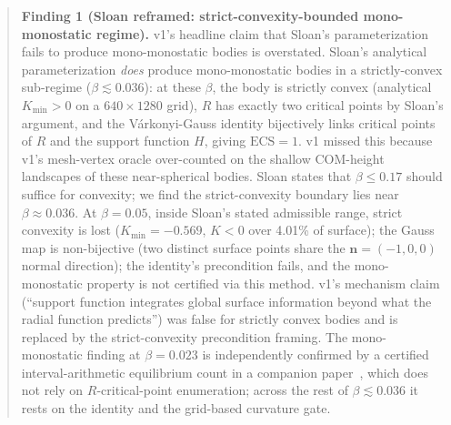 \documentclass[11pt,a4paper]{article}
\begin{document}
\begin{abstract}
\textbf{Finding 1 (Sloan reframed: strict-convexity-bounded
mono-monostatic regime).} v1's headline claim that Sloan's
parameterization fails to produce mono-monostatic bodies is
overstated. Sloan's analytical parameterization \emph{does} produce
mono-monostatic bodies in a strictly-convex sub-regime
($\beta \lesssim 0.036$): at these $\beta$, the body is strictly
convex (analytical $K_{\min} > 0$ on a $640 \times 1280$ grid),
$R$ has exactly two critical points by Sloan's argument, and the
V\'arkonyi-Gauss identity bijectively links critical points of $R$
and the support function $H$, giving $\mathrm{ECS} = 1$. v1 missed
this because v1's mesh-vertex oracle over-counted on the shallow
COM-height landscapes of these near-spherical bodies. Sloan states that $\beta \le 0.17$
should suffice for convexity; we find the strict-convexity boundary
lies near $\beta \approx 0.036$. At $\beta = 0.05$, inside Sloan's
stated admissible range, strict convexity is lost
($K_{\min} = -0.569$, $K<0$ over 4.01\% of surface); the Gauss
map is non-bijective (two distinct surface points share the
$\mathbf{n} = (-1,0,0)$ normal direction); the identity's
precondition fails, and the mono-monostatic property is not
certified via this method. v1's mechanism claim (``support function
integrates global surface information beyond what the radial function
predicts'') was false for strictly convex bodies and is replaced by
the strict-convexity precondition framing. The mono-monostatic
finding at $\beta = 0.023$ is independently confirmed by a certified
interval-arithmetic equilibrium count in a companion
paper~\cite{couey2026harmonic}, which does not rely on
$R$-critical-point enumeration; across the rest of $\beta \lesssim 0.036$
it rests on the identity and the grid-based curvature gate.


\end{abstract}
\end{document}
